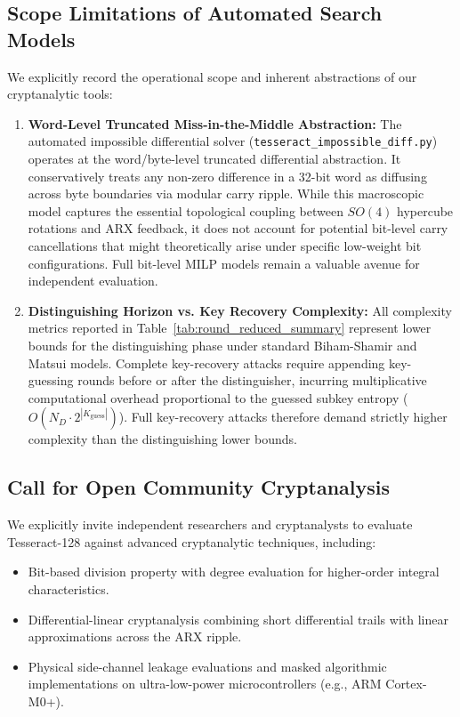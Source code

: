 \documentclass[review,12pt]{elsarticle}
\begin{document}
\subsection{Scope Limitations of Automated Search Models}
We explicitly record the operational scope and inherent abstractions of our cryptanalytic tools:
\begin{enumerate}
    \item \textbf{Word-Level Truncated Miss-in-the-Middle Abstraction:} The automated impossible differential solver (\texttt{tesseract\_impossible\_diff.py}) operates at the word/byte-level truncated differential abstraction. It conservatively treats any non-zero difference in a 32-bit word as diffusing across byte boundaries via modular carry ripple. While this macroscopic model captures the essential topological coupling between $SO(4)$ hypercube rotations and ARX feedback, it does not account for potential bit-level carry cancellations that might theoretically arise under specific low-weight bit configurations. Full bit-level MILP models remain a valuable avenue for independent evaluation.
    \item \textbf{Distinguishing Horizon vs. Key Recovery Complexity:} All complexity metrics reported in Table~\ref{tab:round_reduced_summary} represent lower bounds for the distinguishing phase under standard Biham-Shamir and Matsui models. Complete key-recovery attacks require appending key-guessing rounds before or after the distinguisher, incurring multiplicative computational overhead proportional to the guessed subkey entropy ($O(N_D \cdot 2^{|K_{\text{guess}}|})$). Full key-recovery attacks therefore demand strictly higher complexity than the distinguishing lower bounds.
\end{enumerate}

\subsection{Call for Open Community Cryptanalysis}
We explicitly invite independent researchers and cryptanalysts to evaluate Tesseract-128 against advanced cryptanalytic techniques, including:
\begin{itemize}
    \item Bit-based division property with degree evaluation for higher-order integral characteristics.
    \item Differential-linear cryptanalysis combining short differential trails with linear approximations across the ARX ripple.
    \item Physical side-channel leakage evaluations and masked algorithmic implementations on ultra-low-power microcontrollers (e.g., ARM Cortex-M0+).
\end{itemize}
\end{document}
